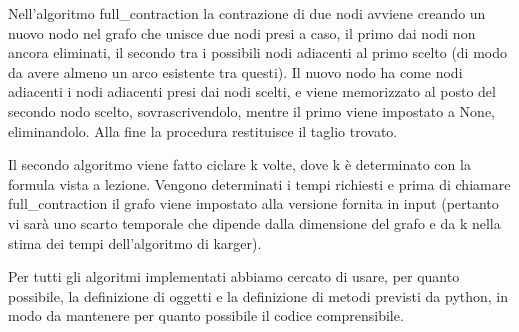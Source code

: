 Nell'algoritmo full\_contraction la contrazione di due nodi avviene creando un nuovo nodo nel grafo che unisce due nodi presi a caso, il primo dai nodi non ancora eliminati, il secondo tra i possibili nodi adiacenti al primo scelto (di modo da avere almeno un arco esistente tra questi).
Il nuovo nodo ha come nodi adiacenti i nodi adiacenti presi dai nodi scelti, e viene memorizzato al posto del secondo nodo scelto, sovrascrivendolo, mentre il primo viene impostato a None, eliminandolo.
Alla fine la procedura restituisce il taglio trovato.

Il secondo algoritmo viene fatto ciclare k volte, dove k è determinato con la formula vista a lezione. Vengono determinati i tempi richiesti e prima di chiamare full\_contraction il grafo viene impostato alla versione fornita in input (pertanto vi sarà uno scarto temporale che dipende dalla dimensione del grafo e da k nella stima dei tempi dell'algoritmo di karger).

Per tutti gli algoritmi implementati abbiamo cercato di usare, per quanto possibile, la definizione di oggetti e la definizione di metodi previsti da python, in modo da mantenere per quanto possibile il codice comprensibile.